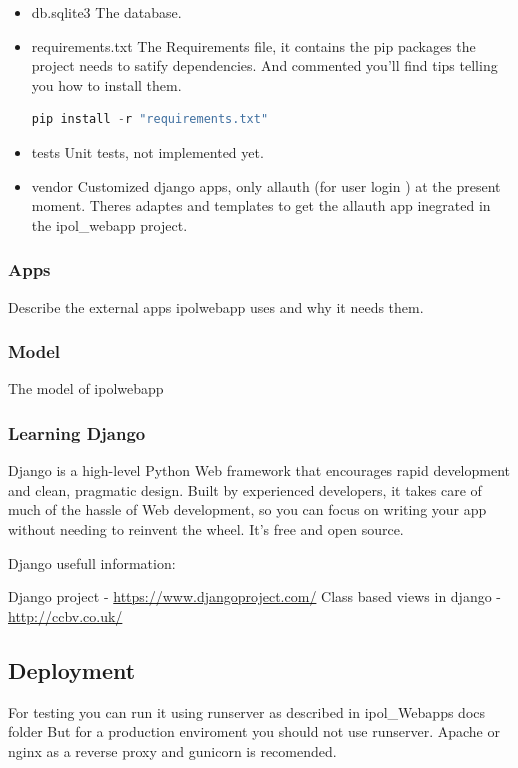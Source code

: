 \begin{itemize}
\item  db.sqlite3
The database.

\item  requirements.txt
The Requirements file, it contains the pip packages the project needs to satify dependencies. And commented you'll find tips telling you how to install them. 
\begin{lstlisting}[language=Python,firstnumber=1]
pip install -r "requirements.txt"
\end{lstlisting}

\item  tests
Unit tests, not implemented yet.

\item  vendor
Customized django apps, only allauth (for user login ) at the present moment. Theres adaptes and templates to get the allauth app inegrated in the ipol\_webapp project.

\end{itemize}


\subsubsection{Apps}
Describe the external apps ipolwebapp uses and why it needs them.

\subsubsection{Model}
The model of ipolwebapp

\subsubsection{Learning Django}
Django is a high-level Python Web framework that encourages rapid development and clean, pragmatic design. Built by experienced developers, it takes care of much of the hassle of Web development, so you can focus on writing your app without needing to reinvent the wheel. It’s free and open source.

Django usefull information:

Django project - \url{https://www.djangoproject.com/}
Class based views in django - \url{http://ccbv.co.uk/}
\subsection{Deployment}
For testing you can run it using runserver as described in ipol\_Webapps docs folder
But for a production enviroment you should not use runserver. Apache or nginx as a reverse proxy and gunicorn is recomended.

